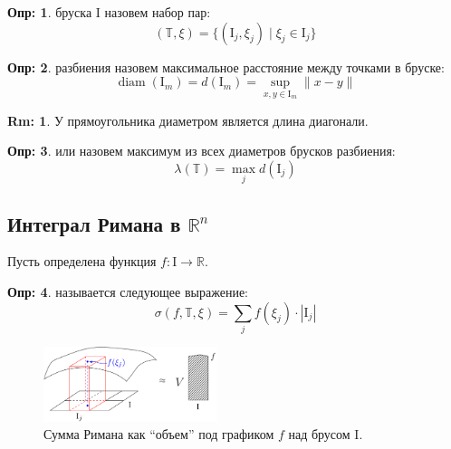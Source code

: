 \documentclass[12pt]{article}
\newcommand{\MR}{\mathbb{R}}
\newcommand{\MTB}{\mathbb{T}}
\newcommand{\MI}{\mathrm{I}}
\theoremstyle{definition}
\newtheorem{defn}{Опр:}
\newtheorem{rem}{Rm:}
\DeclareMathOperator{\diam}{\text{diam}}
\newcommand{\ddsum}[2]{\displaystyle\sum\limits_{#1}^{#2}}
\begin{document}
\begin{defn}
	 бруска $\MI$ назовем набор пар: 
	$$
		(\MTB,\xi) = \{(\MI_j,\xi_j) \mid \xi_j \in \MI_j \}
	$$
\end{defn}
\begin{defn}
	 разбиения назовем максимальное расстояние между точками в бруске: 
	$$
		\diam{(\MI_m)} = d(\MI_m) = \sup\limits_{x,y \in \MI_m}\|x - y\|
	$$
\end{defn}
\begin{rem}
	У прямоугольника диаметром является длина диагонали.
\end{rem}
\begin{defn}
	 или  назовем максимум из всех диаметров брусков разбиения: 
	$$
		\lambda(\MTB) = \max\limits_{j}d(\MI_j)
	$$
\end{defn}
\subsection*{Интеграл Римана в $\MR^n$}
Пусть определена функция $f \colon \MI \to \MR$. 
\begin{defn}
	 называется следующее выражение:
	$$
		\sigma(f,\MTB,\xi) = \ddsum{j}{}f(\xi_j){\cdot}|\MI_j|
	$$
\end{defn}
\begin{figure}[H]
	\centering
	\includegraphics[width=0.45\textwidth]{MA4L1_3.png}
	\caption{Сумма Римана как ``объем'' под графиком $f$ над брусом $\MI$.}
	\label{4_3}
\end{figure}
\end{document}
